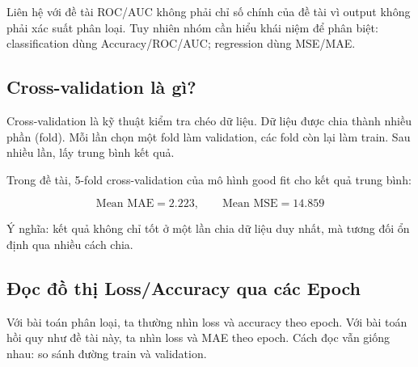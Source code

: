 \documentclass[12pt,a4paper]{article}
\begin{document}
\begin{warnbox}{Liên hệ với đề tài}
ROC/AUC không phải chỉ số chính của đề tài vì output không phải xác suất phân loại. Tuy nhiên nhóm cần hiểu khái niệm để phân biệt: classification dùng Accuracy/ROC/AUC; regression dùng MSE/MAE.
\end{warnbox}

\subsection{Cross-validation là gì?}

Cross-validation là kỹ thuật kiểm tra chéo dữ liệu. Dữ liệu được chia thành nhiều phần (fold). Mỗi lần chọn một fold làm validation, các fold còn lại làm train. Sau nhiều lần, lấy trung bình kết quả.

\begin{center}
\end{center}

Trong đề tài, 5-fold cross-validation của mô hình good fit cho kết quả trung bình:

\[
    \text{Mean MAE}=2.223,\qquad \text{Mean MSE}=14.859
\]

Ý nghĩa: kết quả không chỉ tốt ở một lần chia dữ liệu duy nhất, mà tương đối ổn định qua nhiều cách chia.

\subsection{Đọc đồ thị Loss/Accuracy qua các Epoch}

Với bài toán phân loại, ta thường nhìn loss và accuracy theo epoch. Với bài toán hồi quy như đề tài này, ta nhìn loss và MAE theo epoch. Cách đọc vẫn giống nhau: so sánh đường train và validation.
\end{document}
